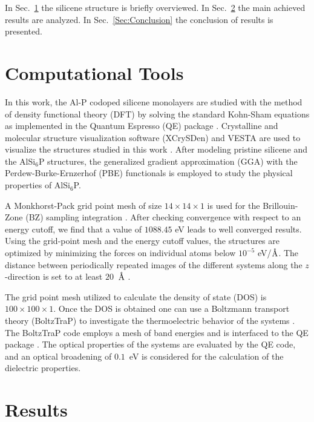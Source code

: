 \documentclass[5p,twocolumn]{elsarticle}
\newcommand{\angstrom}{\text{\normalfont\AA}}
\def\sec#1{Sec.\ \ref{#1}}
\begin{document}
In \sec{Sec:Model} the silicene structure is briefly overviewed. In \sec{Sec:Results} the main achieved results are analyzed. In \sec{Sec:Conclusion} the conclusion of results is presented.



\section{Computational Tools}\label{Sec:Model}

In this work, the Al-P codoped silicene monolayers are studied with the method of density functional theory (DFT) by solving the standard Kohn-Sham equations as 
implemented in the Quantum Espresso (QE) package \cite{Giannozzi_2009, giannozzi2017advanced}.
Crystalline and molecular structure visualization software (XCrySDen) and VESTA
are used to visualize the structures studied in this work \cite{KOKALJ1999176, momma2011vesta}.
After modeling pristine silicene and the AlSi$_6$P structures, 
the generalized gradient approximation (GGA) with the Perdew-Burke-Ernzerhof (PBE) functionals \cite{PhysRevLett.77.3865} is employed to study the physical properties of AlSi$_6$P.

A Monkhorst-Pack grid point mesh of size $14\times14\times1$ is used for the Brillouin-Zone (BZ) sampling integration \cite{PhysRevB.13.5188,ABDULLAH2021106073}. After checking convergence with respect to an energy cutoff, we find that a value of $1088.45$ eV leads to well converged results. 
Using the grid-point mesh and the energy cutoff values, the structures are optimized
by minimizing the forces on individual atoms below  $10^{-5}$ eV/$\angstrom$.
The distance between periodically repeated images of the different systems along the $z$-direction is set to at least $20$~$\angstrom$ \cite{ABDULLAH2021106981}.

The grid point mesh utilized to calculate the density of state (DOS) is $100\times100\times1$. 
Once the DOS is obtained one can use a Boltzmann transport theory (BoltzTraP) to investigate the thermoelectric behavior of the systems \cite{madsen2006boltztrap-2}. The BoltzTraP code employs a mesh of band energies and is interfaced to the QE package \cite{ABDULLAH2020126578}. 
%
The optical properties of the systems are evaluated by the QE code, and 
an optical broadening of $0.1$~eV is considered for the calculation of
the dielectric properties.




\section{Results}\label{Sec:Results}
\end{document}
